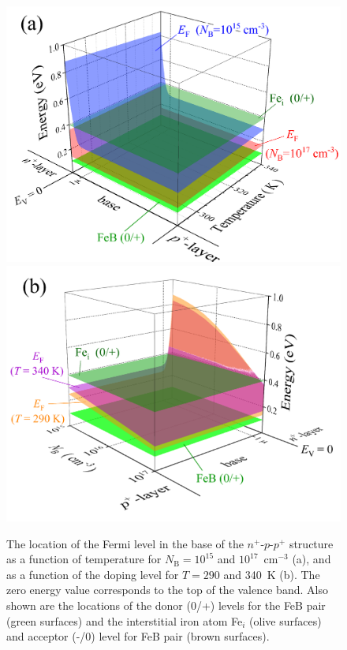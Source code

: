\documentclass[a4paper,fleqn]{cas-sc}
\begin{document}
\begin{figure}
	\centering
     \includegraphics[width=0.49\linewidth]{Fig4a.png}
     \includegraphics[width=0.49\linewidth]{Fig4b.png}
	  \caption{The location of the Fermi level in the base of the $n^+$-$p$-$p^+$ structure
       as a function of temperature for $N_\mathrm{B}=10^{15}$ and $10^{17}$~cm$^{-3}$ (a),
       and as a function of the doping level for $T=290$ and 340~K (b).
       The zero energy value corresponds to the top of the valence band.
       Also shown are the locations of the donor (0/+) levels for the FeB pair (green surfaces)
       and the interstitial iron atom Fe$_i$ (olive surfaces) and acceptor (-/0) level for FeB pair (brown surfaces).
}\label{fig4}
\end{figure}
\end{document}
